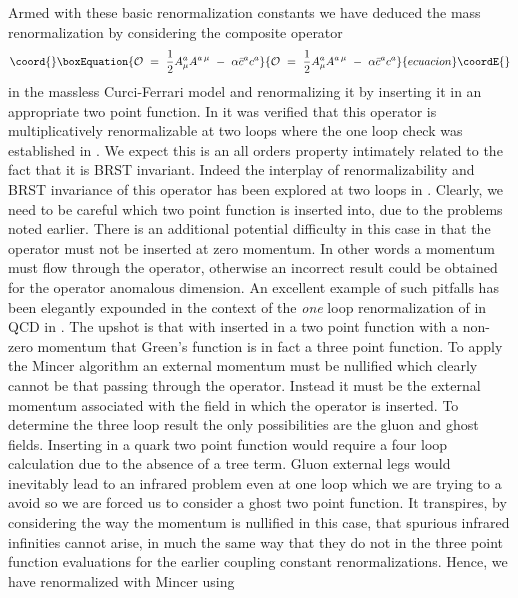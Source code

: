 \documentclass[a4paper,11pt]{article}
\begin{document}
Armed with these basic renormalization constants we have deduced the mass
renormalization by considering the composite operator 
\begin{equation}\coord{}\boxEquation{ 
{\cal O} ~=~ \frac{1}{2} A^a_\mu A^{a \, \mu} ~-~ \alpha \bar{c}^a c^a
}{ 
{\cal O} ~=~ \frac{1}{2} A^a_\mu A^{a \, \mu} ~-~ \alpha \bar{c}^a c^a
}{ecuacion}\coordE{}\end{equation} 
in the massless Curci-Ferrari model and renormalizing it by inserting it in an
appropriate two point function. In \cite{44} it was verified that this operator
is multiplicatively renormalizable at two loops where the one loop check was
established in \cite{5}. We expect this is an all orders property intimately 
related to the fact that it is BRST invariant. Indeed the interplay of 
renormalizability and BRST invariance of this operator has been explored at 
two loops in \cite{44}. Clearly, we need to be careful which two point function 
\coordHE{} is inserted into, due to the problems noted earlier. There is an 
additional potential difficulty in this case in that the operator must not be 
inserted at zero momentum. In other words a momentum must flow through the 
operator, otherwise an incorrect result could be obtained for the operator
anomalous dimension. An excellent example of such pitfalls has been elegantly
expounded in the context of the {\em one} loop renormalization of
\coordHE{} in QCD in \cite{45}. The upshot is that with \coordHE{}
inserted in a two point function with a non-zero momentum that Green's function
is in fact a three point function. To apply the {\sc Mincer} algorithm an 
external momentum must be nullified which clearly cannot be that passing 
through the operator. Instead it must be the external momentum associated with 
the field in which the operator is inserted. To determine the three loop result
the only possibilities are the gluon and ghost fields. Inserting in a quark two
point function would require a four loop calculation due to the absence of a 
tree term. Gluon external legs would inevitably lead to an infrared problem 
even at one loop which we are trying to a avoid so we are forced us to consider
a ghost two point function. It transpires, by considering the way the momentum 
is nullified in this case, that spurious infrared infinities cannot arise, in 
much the same way that they do not in the three point function evaluations for 
the earlier coupling constant renormalizations. Hence, we have renormalized 
\coordHE{} with {\sc Mincer} using
\end{document}

